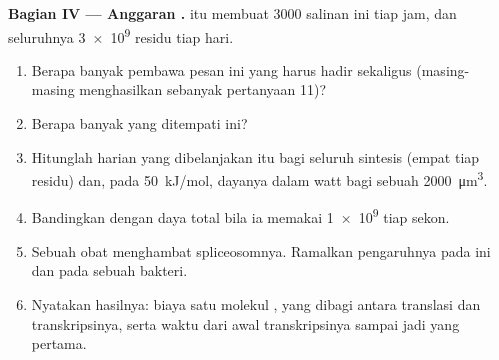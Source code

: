 \begin{problem}
\medskip
\noindent\textbf{Bagian IV --- Anggaran .}
 itu membuat \num{3000} salinan  ini tiap jam, dan
seluruhnya \num{3e9} residu  tiap hari.
\begin{enumerate}[resume]
  \item Berapa banyak pembawa pesan  ini yang harus hadir sekaligus
        (masing-masing menghasilkan sebanyak pertanyaan 11)?
  \item Berapa banyak  yang ditempati  ini?
  \item Hitunglah  harian yang dibelanjakan  itu bagi seluruh
        sintesis  (empat tiap residu) dan, pada
        \qty{50}{kJ/mol}, dayanya dalam watt bagi sebuah 
        \qty{2000}{\micro m^3}.
  \item Bandingkan dengan daya total  bila ia memakai
        \qty{1e9}{}  tiap sekon.
  \item Sebuah obat menghambat spliceosomnya. Ramalkan pengaruhnya
        pada  ini dan pada sebuah  bakteri.
  \item Nyatakan hasilnya: biaya  satu molekul , yang
        dibagi antara translasi dan transkripsinya, serta waktu dari
        awal transkripsinya sampai  jadi yang pertama.
\end{enumerate}
\end{problem}
